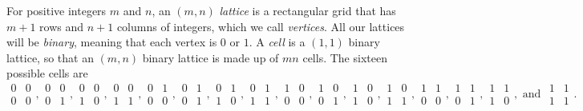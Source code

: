 \documentclass[12pt]{article}
\theoremstyle{plain}
\theoremstyle{remark}
\theoremstyle{definition}
\theoremstyle{remark}
\theoremstyle{definition}
\begin{document}
For positive integers $m$ and $n$, an $\left(m,n\right)$\emph{ lattice} is a rectangular grid that has $m+1$ rows and $n+1$ columns of integers, which we call \emph{vertices}. All our lattices will be \emph{binary}, meaning that each vertex is $0$ or $1$. A \emph{cell} is a $\left(1,1\right)$ binary lattice, so that an $\left(m,n\right)$ binary lattice is made up of $mn$ cells. The sixteen possible cells
are 
\[
\begin{smallmatrix}0 & 0\\
0 & 0
\end{smallmatrix},\begin{smallmatrix}0 & 0\\
0 & 1
\end{smallmatrix},\begin{smallmatrix}0 & 0\\
1 & 0
\end{smallmatrix},\begin{smallmatrix}0 & 0\\
1 & 1
\end{smallmatrix},\begin{smallmatrix}0 & 1\\
0 & 0
\end{smallmatrix},\begin{smallmatrix}0 & 1\\
0 & 1
\end{smallmatrix},\begin{smallmatrix}0 & 1\\
1 & 0
\end{smallmatrix},\begin{smallmatrix}0 & 1\\
1 & 1
\end{smallmatrix},\begin{smallmatrix}1 & 0\\
0 & 0
\end{smallmatrix},\begin{smallmatrix}1 & 0\\
0 & 1
\end{smallmatrix},\begin{smallmatrix}1 & 0\\
1 & 0
\end{smallmatrix},\begin{smallmatrix}1 & 0\\
1 & 1
\end{smallmatrix},\begin{smallmatrix}1 & 1\\
0 & 0
\end{smallmatrix},\begin{smallmatrix}1 & 1\\
0 & 1
\end{smallmatrix},\begin{smallmatrix}1 & 1\\
1 & 0
\end{smallmatrix},\text{ and }\begin{smallmatrix}1 & 1\\
1 & 1
\end{smallmatrix}.
\]
\end{document}

